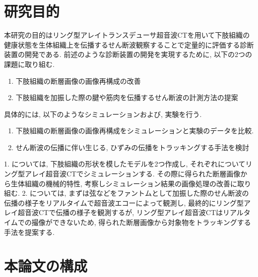 \section{研究目的}
本研究の目的はリング型アレイトランスデューサ超音波CTを用いて下肢組織の健康状態を生体組織上を伝播するせん断波観察することで定量的に評価する診断装置の開発である. 前述のような診断装置の開発を実現するために, 以下の2つの課題に取り組む. 
\begin{enumerate}
   \item 下肢組織の断層画像の画像再構成の改善
   \item 下肢組織を加振した際の腱や筋肉を伝播するせん断波の計測方法の提案
\end{enumerate}
具体的には, 以下のようなシミュレーションおよび, 実験を行う.
\begin{enumerate}
   \item 下肢組織の断層画像の画像再構成をシミュレーションと実験のデータを比較.
   \item せん断波の伝播に伴い生じる, ひずみの伝播をトラッキングする手法を検討
\end{enumerate}
1. については, 下肢組織の形状を模したモデルを2つ作成し, それぞれについてリング型アレイ超音波CTでシミュレーションする. その際に得られた断層画像から生体組織の機械的特性, 考察しシミュレーション結果の画像処理の改善に取り組む. 2. については, まずは弦などをファントムとして加振した際のせん断波の伝播の様子をリアルタイムで超音波エコーによって観測し, 最終的にリング型アレイ超音波CTで伝播の様子を観測するが, リング型アレイ超音波CTはリアルタイムでの撮像ができないため, 得られた断層画像から対象物をトラッキングする手法を提案する. 

\section{本論文の構成}






